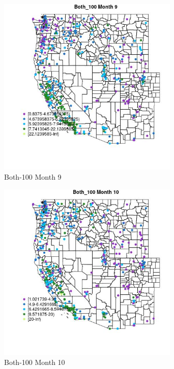 \begin{figure} 
\centering  
\includegraphics[width=0.77\textwidth]{Code_Outputs/ML_input_report_ML_input_PM25_Step5_part_d_de_duplicated_aves_ML_input_MapObsMo9Both_100.jpg} 
\caption{\label{fig:ML_input_report_ML_input_PM25_Step5_part_d_de_duplicated_aves_ML_inputMapObsMo9Both_100}Both-100 Month 9} 
\end{figure} 
 

\begin{figure} 
\centering  
\includegraphics[width=0.77\textwidth]{Code_Outputs/ML_input_report_ML_input_PM25_Step5_part_d_de_duplicated_aves_ML_input_MapObsMo10Both_100.jpg} 
\caption{\label{fig:ML_input_report_ML_input_PM25_Step5_part_d_de_duplicated_aves_ML_inputMapObsMo10Both_100}Both-100 Month 10} 
\end{figure} 
 

